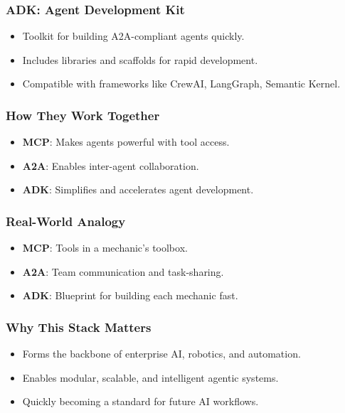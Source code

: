 \begin{frame}[fragile]\frametitle{ADK: Agent Development Kit}
    \begin{itemize}
        \item Toolkit for building A2A-compliant agents quickly.
        \item Includes libraries and scaffolds for rapid development.
        \item Compatible with frameworks like CrewAI, LangGraph, Semantic Kernel.
    \end{itemize}
\end{frame}

\begin{frame}[fragile]\frametitle{How They Work Together}
    \begin{itemize}
        \item \textbf{MCP}: Makes agents powerful with tool access.
        \item \textbf{A2A}: Enables inter-agent collaboration.
        \item \textbf{ADK}: Simplifies and accelerates agent development.
    \end{itemize}
\end{frame}

\begin{frame}[fragile]\frametitle{Real-World Analogy}
    \begin{itemize}
        \item \textbf{MCP}: Tools in a mechanic's toolbox.
        \item \textbf{A2A}: Team communication and task-sharing.
        \item \textbf{ADK}: Blueprint for building each mechanic fast.
    \end{itemize}
\end{frame}

\begin{frame}[fragile]\frametitle{Why This Stack Matters}
    \begin{itemize}
        \item Forms the backbone of enterprise AI, robotics, and automation.
        \item Enables modular, scalable, and intelligent agentic systems.
        \item Quickly becoming a standard for future AI workflows.
    \end{itemize}
\end{frame}


